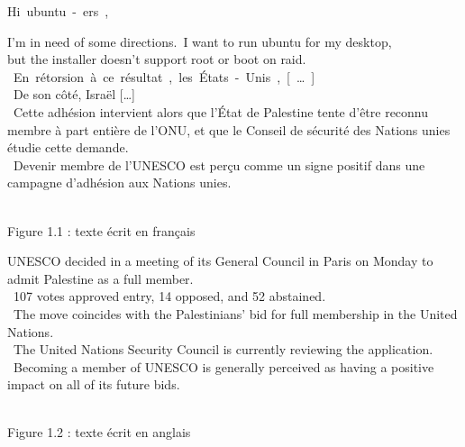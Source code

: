 \begin{multicols}
\begin{rhetoricaltext} \footnotesize
\unit[1]{Hi ubuntu-ers,} 

\unit[2]{I'm in need of some directions.} 
\unit[3]{I want to run ubuntu for my desktop, \\
but the installer doesn't support root or boot on raid.  } \\ %
\unit[5]{En rétorsion à ce résultat, les États-Unis, [\ldots]}  \\ %
\unit[7]{De son côté, Israël [\ldots] } \\ %
\unit[8]{Cette adhésion intervient alors que l'État de Palestine tente d'être reconnu membre à part entière de l'ONU, 
et que le Conseil de sécurité des Nations unies étudie cette demande. } \\
\unit[9]{Devenir membre de l'UNESCO est %
perçu comme un signe positif dans une campagne d'adhésion aux Nations unies. } 
\end{rhetoricaltext}
\\ Figure 1.1 : texte écrit en français
\newpage
\begin{rhetoricaltext} \footnotesize
\unit[10]{UNESCO decided in a meeting of its General Council in Paris on Monday to admit Palestine as a full member.}\\
\unit[11]{107 votes approved entry, 14 opposed, and 52 abstained.}\\
\unit[12]{The move coincides with the Palestinians' bid for full membership in the United Nations. }\\
\unit[13]{The United Nations Security Council is currently reviewing the application. }\\
\unit[14]{Becoming a member of UNESCO is generally perceived as having a positive impact on all of its future bids.}
\end{rhetoricaltext}
\\Figure 1.2 :  texte écrit en anglais
\end{multicols}
